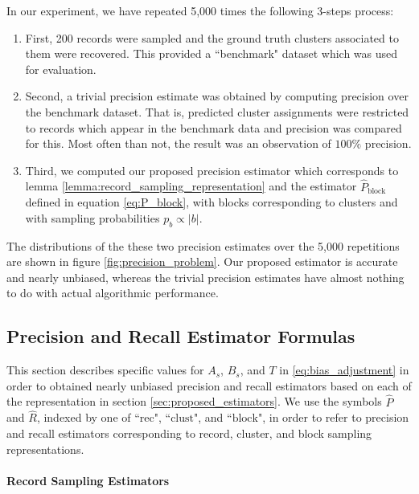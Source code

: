 \documentclass[fontsize=11pt]{article}
\theoremstyle{definition}
\begin{document}
In our experiment, we have repeated 5,000 times the following 3-steps process:
\begin{enumerate}
    \item First, 200 records were sampled and the ground truth clusters associated to them were recovered. This provided a ``benchmark" dataset which was used for evaluation.
    \item Second, a trivial precision estimate was obtained by computing precision over the benchmark dataset. That is, predicted cluster assignments were restricted to records which appear in the benchmark data and precision was compared for this. Most often than not, the result was an observation of $100\%$ precision.
    \item Third, we computed our proposed precision estimator which corresponds to lemma \ref{lemma:record_sampling_representation} and the estimator $\widehat P_{\text{block}}$ defined in equation \eqref{eq:P_block}, with blocks corresponding to clusters and with sampling probabilities $p_b \propto \lvert b \rvert$.
\end{enumerate}
The distributions of the these two precision estimates over the 5,000 repetitions are shown in figure \ref{fig:precision_problem}. Our proposed estimator is accurate and nearly unbiased, whereas the trivial precision estimates have almost nothing to do with actual algorithmic performance.

\subsection{Precision and Recall Estimator Formulas}

This section describes specific values for $A_s$, $B_s$, and $T$ in \eqref{eq:bias_adjustment} in order to obtained nearly unbiased precision and recall estimators based on each of the representation in section \ref{sec:proposed_estimators}. We use the symbols $\widehat P$ and $\widehat R$, indexed by one of ``$\text{rec}$", ``$\text{clust}$", and ``$\text{block}$", in order to refer to precision and recall estimators corresponding to record, cluster, and block sampling representations.

\paragraph{Record Sampling Estimators}
\end{document}
